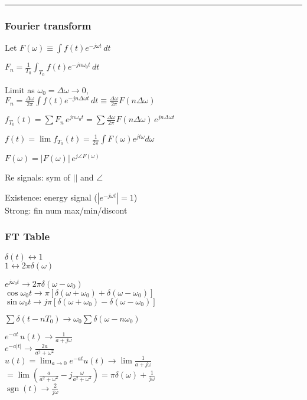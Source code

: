 \documentclass[4pt]{article}
\theoremstyle{definition}
\theoremstyle{definition}
\renewcommand{\o}{\omega}
\newcommand{\ra}{\rightarrow}
\newcommand{\lra}{\leftrightarrow}
\DeclareMathOperator{\sgn}{sgn}
\begin{document}
\begin{multicols}{3}
\rule{\linewidth}{0.5pt}
\newline
\subsubsection{Fourier transform}
    Let \(F(\omega) \equiv \int f(t) e^{-j\omega t} \, dt\)

    \(F_n = \frac 1 {T_0} \int_{T_0} f(t) e^{-jn\omega_0 t} \, dt\)

    Limit as $\omega_0 =\Delta\omega \ra 0$,\\
    \(F_n = \frac {\Delta\omega}{2\pi} \int f(t) e^{-jn\Delta\omega t} \, dt
    \equiv \frac{\Delta\omega}{2\pi} F(n\Delta\omega)\) %

    \(f_{T_0}(t) = \sum F_n\, e^{jn\omega_0 t} = \sum \frac {\Delta\omega} {2\pi} F(n\Delta\omega)\,  e^{jn\Delta\omega t}\)

    \(f(t) = \lim f_{T_0} (t) = \frac{1}{2\pi}\int F(\omega) e^{jt\omega} d\omega\)

    \(F(\omega) = |F(\omega)| \, e^{j\angle F(\omega)}\)

    Re signals: sym of $||$ and $\angle$

    Existence: energy signal ($|e^{-j\o t}| = 1$)\\
    Strong: fin num max/min/discont

\subsubsection{FT Table}

    \(\delta(t) \lra 1\)\\
    $1 \lra 2\pi\delta(\omega)$

    \(e^{j\o_0 t}\ra 2\pi\delta(\o - \o_0)\)\\         %
    \(\cos \o_0 t\ra \pi[\delta(\o+\o_0) + \delta(\o - \o_0)]\)\\
    \(\sin \o_0 t\ra j\pi[\delta(\o + \o_0) - \delta(\o - \o_0)]\)

    \(\sum \delta(t-nT_0) \ra \o_0\sum \delta(\o - n\o_0)\)        %

    $e^{-at} \, u(t) \ra \frac{1}{a+j\omega}$\\         %
    $e^{-a|t|} \ra \frac{2a}{a^2+\omega^2}$ \\
    \(u(t) = \lim_{a\ra 0} e^{-at} u(t)\ra \lim \frac{1}{a+j\o}\)
    \( = \lim(\frac{a}{a^2+\o^2} - j\frac{\o}{a^2+\o^2 }) = \pi\delta(\o) + \frac{1}{j\o}\) \\      %
    \(\sgn(t)\ra \frac{2}{j\o}\)


\end{multicols}
\end{document}
